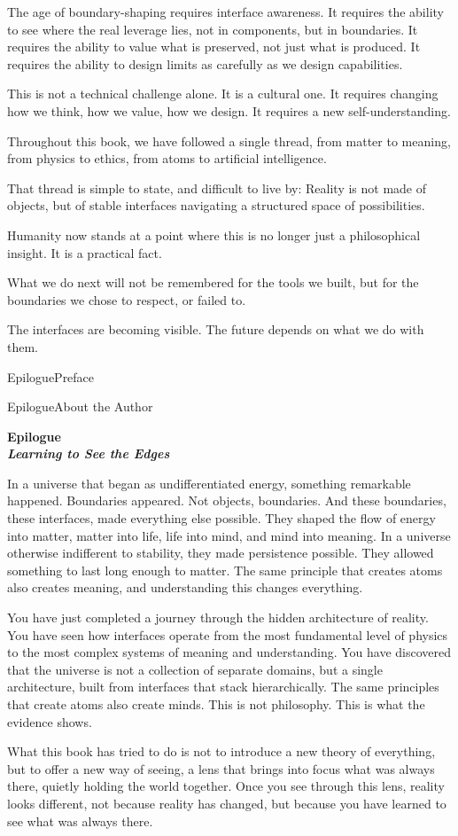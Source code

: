 \documentclass[
  openright]{book}
\makeatletter
\newcommand{\myepilogue}[2]{%
  \cleardoublepage%
  \phantomsection%
  \bookmarksetup{startatroot}%
  \addcontentsline{toc}{part}{#1}%
  \thispagestyle{empty}%
  \vspace*{\fill}%
  \begin{center}%
    \Huge\bfseries #1\\[0.5\baselineskip]%
    \Large\itshape #2%
  \end{center}%
  \vspace*{\fill}%
  \clearpage%
}
\def\temp{#2}%
\def\tempb{About the Author}%
\let\oldaddcontentsline\addcontentsline
\newif\ifprefaceadded
\newif\ifaboutauthoradded
\renewcommand{\addcontentsline}[3]{%
  \def\temp{#3}%
  \def\tempa{Preface}%
  \def\tempb{About the Author}%
  \ifx\temp\tempa
    \ifprefaceadded\else
      \oldaddcontentsline{toc}{part}{#3}%
      \prefaceaddedtrue
    \fi
  \else
    \ifx\temp\tempb
      \ifaboutauthoradded\else
        \oldaddcontentsline{toc}{part}{#3}%
        \aboutauthoraddedtrue
      \fi
    \else
      \oldaddcontentsline{#1}{#2}{#3}%
    \fi
  \fi
}
\makeatother
\begin{document}
The age of boundary-shaping requires interface awareness. It requires
the ability to see where the real leverage lies, not in components, but
in boundaries. It requires the ability to value what is preserved, not
just what is produced. It requires the ability to design limits as
carefully as we design capabilities.

This is not a technical challenge alone. It is a cultural one. It
requires changing how we think, how we value, how we design. It requires
a new self-understanding.

Throughout this book, we have followed a single thread, from matter to
meaning, from physics to ethics, from atoms to artificial intelligence.

That thread is simple to state, and difficult to live by: Reality is not
made of objects, but of stable interfaces navigating a structured space
of possibilities.

Humanity now stands at a point where this is no longer just a
philosophical insight. It is a practical fact.

What we do next will not be remembered for the tools we built, but for
the boundaries we chose to respect, or failed to.

The interfaces are becoming visible. The future depends on what we do
with them.

\myepilogue{Epilogue}{Learning to See the Edges}

In a universe that began as undifferentiated energy, something
remarkable happened. Boundaries appeared. Not objects, boundaries. And
these boundaries, these interfaces, made everything else possible. They
shaped the flow of energy into matter, matter into life, life into mind,
and mind into meaning. In a universe otherwise indifferent to stability,
they made persistence possible. They allowed something to last long
enough to matter. The same principle that creates atoms also creates
meaning, and understanding this changes everything.

You have just completed a journey through the hidden architecture of
reality. You have seen how interfaces operate from the most fundamental
level of physics to the most complex systems of meaning and
understanding. You have discovered that the universe is not a collection
of separate domains, but a single architecture, built from interfaces
that stack hierarchically. The same principles that create atoms also
create minds. This is not philosophy. This is what the evidence shows.

What this book has tried to do is not to introduce a new theory of
everything, but to offer a new way of seeing, a lens that brings into
focus what was always there, quietly holding the world together. Once
you see through this lens, reality looks different, not because reality
has changed, but because you have learned to see what was always there.
\end{document}
